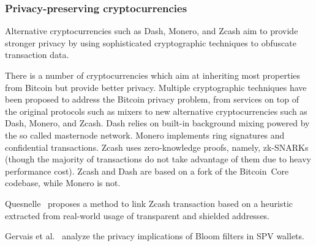 \subsubsection*{Privacy-preserving cryptocurrencies}

Alternative cryptocurrencies such as Dash, Monero, and Zcash aim to provide stronger privacy by using sophisticated cryptographic techniques to obfuscate transaction data.

There is a number of cryptocurrencies which aim at inheriting most properties from Bitcoin but provide better privacy.
Multiple cryptographic techniques have been proposed to address the Bitcoin privacy problem, from services on top of the original protocols such as mixers to new alternative cryptocurrencies such as Dash, Monero, and Zcash.
Dash relies on built-in background mixing powered by the so called masternode network.
Monero implements ring signatures and confidential transactions.
Zcash uses zero-knowledge proofs, namely, zk-SNARKs (though the majority of transactions do not take advantage of them due to heavy performance cost).
Zcash and Dash are based on a fork of the Bitcoin~Core codebase, while Monero is not.




Quesnelle~\cite{Quesnelle2017} proposes a method to link Zcash transaction based on a heuristic extracted from real-world usage of transparent and shielded addresses.

Gervais et al.~\cite{Gervais2014} analyze the privacy implications of Bloom filters in SPV wallets.








